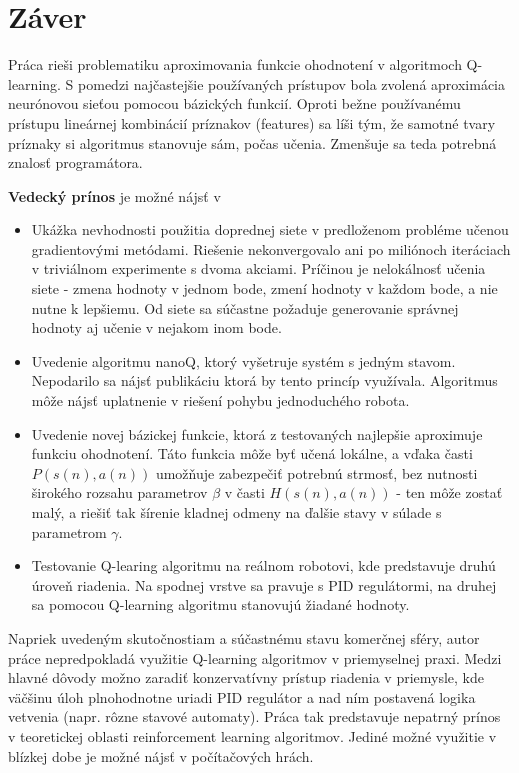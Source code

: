 \chapter{Záver}

Práca rieši problematiku aproximovania funkcie ohodnotení v algoritmoch Q-learning.
S pomedzi najčastejšie používaných prístupov bola zvolená aproximácia neurónovou
sieťou pomocou bázických funkcií. Oproti bežne používanému prístupu lineárnej kombinácií
príznakov (features) sa líši tým, že samotné tvary príznaky si algoritmus stanovuje sám,
počas učenia. Zmenšuje sa teda potrebná znalosť programátora.

{\bf Vedecký prínos} je možné nájsť v
\begin{itemize}
  \item Ukážka nevhodnosti použitia doprednej siete v predloženom probléme učenou
  gradientovými metódami. Riešenie nekonvergovalo ani po miliónoch iteráciach v triviálnom
  experimente s dvoma akciami. Príčinou je nelokálnosť učenia siete - zmena hodnoty v jednom bode,
  zmení hodnoty v každom bode, a nie nutne k lepšiemu. Od siete sa súčastne požaduje generovanie
  správnej hodnoty aj učenie v nejakom inom bode.
  \item Uvedenie algoritmu nanoQ, ktorý vyšetruje systém s jedným stavom. Nepodarilo sa nájsť
  publikáciu ktorá by tento princíp využívala. Algoritmus môže nájsť uplatnenie v riešení pohybu
  jednoduchého robota.
  \item Uvedenie novej bázickej funkcie, ktorá z testovaných najlepšie aproximuje funkciu ohodnotení.
  Táto funkcia môže byť učená lokálne, a vďaka časti $P(s(n), a(n))$ umožňuje zabezpečiť potrebnú
  strmosť, bez nutnosti širokého rozsahu parametrov $\beta$ v časti $H(s(n), a(n))$ - ten
  môže zostať malý, a riešiť tak šírenie kladnej odmeny na ďalšie stavy v súlade s parametrom
  $\gamma$.
  \item Testovanie Q-learing algoritmu na reálnom robotovi, kde predstavuje druhú úroveň
  riadenia. Na spodnej vrstve sa pravuje s PID regulátormi, na druhej sa pomocou Q-learning
  algoritmu stanovujú žiadané hodnoty.
\end{itemize}

Napriek uvedeným skutočnostiam a súčastnému stavu komerčnej sféry, autor práce nepredpokladá
využitie Q-learning algoritmov v priemyselnej praxi. Medzi hlavné dôvody možno zaradiť
konzervatívny prístup riadenia v priemysle, kde väčšinu úloh plnohodnotne uriadi PID
regulátor a nad ním postavená logika vetvenia (napr. rôzne stavové automaty).
Práca tak predstavuje nepatrný prínos v teoretickej oblasti reinforcement learning algoritmov.
Jediné možné využitie v blízkej dobe je možné nájsť v počítačových hrách.
